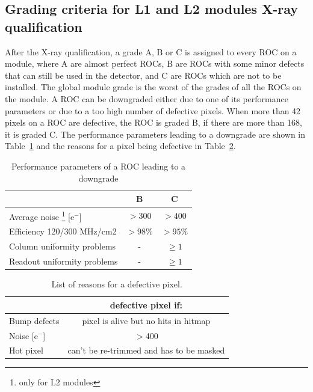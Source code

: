 \documentclass[a4paper,12pt,twoside]{article}
\begin{document}
\begin{appendices}
\section{Grading criteria for L1 and L2 modules X-ray qualification} \label{Grading}

After the X-ray qualification, a grade A, B or C is assigned to every ROC on a module, where A are almost perfect ROCs, B are ROCs with some minor defects that can still be used in the detector, and C are ROCs which are not to be installed. The global module grade is the worst of the grades of all the ROCs on the module. A ROC can be downgraded either due to one of its performance parameters or due to a too high number of defective pixels. When more than 42 pixels on a ROC are defective, the ROC is graded B, if there are more than 168, it is graded C. The performance parameters leading to a downgrade are shown in Table~\ref{performanceparameters} and the reasons for a pixel being defective in Table~\ref{defectivepixel}.

\begin{table}[h!]
\centering
\caption{Performance parameters of a ROC leading to a downgrade}
\label{performanceparameters}
\begin{tabular}{@{}lcc@{}}
\toprule
                                             & B & C \\ \midrule
Average noise \footnote{only for L2 modules} [e$^{-}$] & $>300$   &  $>400$ \\
Efficiency 120/300 MHz/cm2   &  $>98\%$  & $>95\%$ \\
Column uniformity problems &  - & $\geq 1$ \\
Readout uniformity problems &  -  & $\geq 1$ \\ \bottomrule
\end{tabular}
\end{table}


\begin{table}[h!]
\centering
\caption{List of reasons for a defective pixel.}
\label{defectivepixel}
\begin{tabular}{@{}lc@{}}
\toprule
                                            & defective pixel if: \\ \midrule
Bump defects  &  pixel is alive but no hits in hitmap \\
Noise [e$^{-}$] & $>$400 \\
Hot pixel & can't be re-trimmed and has to be masked \\ \bottomrule
\end{tabular}
\end{table}


\end{appendices}
\end{document}
